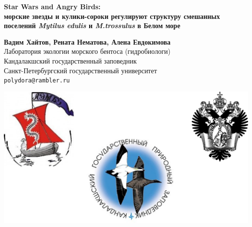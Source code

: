 \documentclass[20pt,a0,portrait]{a0poster}
\begin{document}


	
	
	
	
	\begin{minipage}[b]{0.95\linewidth}
	\center
	
		\veryHuge \color{NavyBlue} \textbf{Star Wars and Angry Birds:}\\ 
		\Huge \color{NavyBlue} \textbf{морские звезды и кулики-сороки регулируют структуру смешанных поселений \emph{Mytilus edulis} и \emph{M.trossulus} в Белом море } \color{NavyBlue}\\ %
	\end{minipage}

\vspace{1cm}
	\begin{minipage}[b]{0.75\linewidth}
		\Large \textbf{Вадим Хайтов,  Рената Нематова, Алена Евдокимова}\\[0.5cm] %
		\large Лаборатория экологии морского бентоса (гидробиологи)\\[0.4cm] %
		\large Кандалакшский государственный заповедник\\[0.4cm] %
		\large Санкт-Петербургский государственный университет\\[0.4cm] %
		\large \texttt{polydora@rambler.ru}\\
	\end{minipage}
	\begin{minipage}[b]{0.25\linewidth}
		\includegraphics[width=15 cm]{logos.jpg}\\
	\end{minipage}
	
\end{document}
